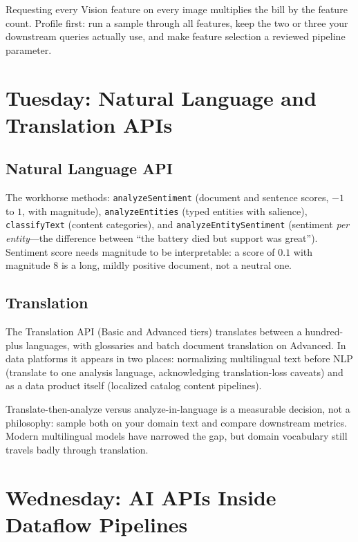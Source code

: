 \begin{pitfall}
Requesting every Vision feature on every image multiplies the bill by the feature count. Profile first: run a sample through all features, keep the two or three your downstream queries actually use, and make feature selection a reviewed pipeline parameter.
\end{pitfall}

\section{Tuesday: Natural Language and Translation APIs}

\subsection{Natural Language API}
The workhorse methods: \texttt{analyzeSentiment} (document and sentence scores, $-1$ to $1$, with magnitude), \texttt{analyzeEntities} (typed entities with salience), \texttt{classifyText} (content categories), and \texttt{analyzeEntitySentiment} (sentiment \emph{per entity}---the difference between ``the battery died but support was great''). Sentiment score needs magnitude to be interpretable: a score of $0.1$ with magnitude $8$ is a long, mildly positive document, not a neutral one.

\subsection{Translation}
The Translation API (Basic and Advanced tiers) translates between a hundred-plus languages, with glossaries and batch document translation on Advanced. In data platforms it appears in two places: normalizing multilingual text before NLP (translate to one analysis language, acknowledging translation-loss caveats) and as a data product itself (localized catalog content pipelines).

\begin{tipbox}
Translate-then-analyze versus analyze-in-language is a measurable decision, not a philosophy: sample both on your domain text and compare downstream metrics. Modern multilingual models have narrowed the gap, but domain vocabulary still travels badly through translation.
\end{tipbox}

\section{Wednesday: AI APIs Inside Dataflow Pipelines}

